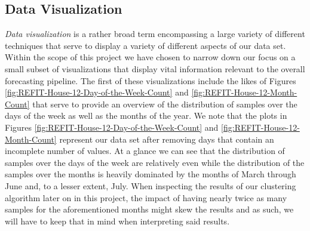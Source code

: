 \subsection{Data Visualization}
\label{subsec:Exploratory-Data-Analysis:REFIT:Data-Visualization}
\textit{Data visualization} is a rather broad term encompassing a large variety of different techniques that serve to display a variety of different aspects of our data set. Within the scope of this project we have chosen to narrow down our focus on a small subset of visualizations that display vital information relevant to the overall forecasting pipeline. The first of these visualizations include the likes of Figures \ref{fig:REFIT-House-12-Day-of-the-Week-Count} and \ref{fig:REFIT-House-12-Month-Count} that serve to provide an overview of the distribution of samples over the days of the week as well as the months of the year. We note that the plots in Figures \ref{fig:REFIT-House-12-Day-of-the-Week-Count} and \ref{fig:REFIT-House-12-Month-Count} represent our data set after removing days that contain an incomplete number of values. At a glance we can see that the distribution of samples over the days of the week are relatively even while the distribution of the samples over the months is heavily dominated by the months of March through June and, to a lesser extent, July. When inspecting the results of our clustering algorithm later on in this project, the impact of having nearly twice as many samples for the aforementioned months might skew the results and as such, we will have to keep that in mind when interpreting said results.

